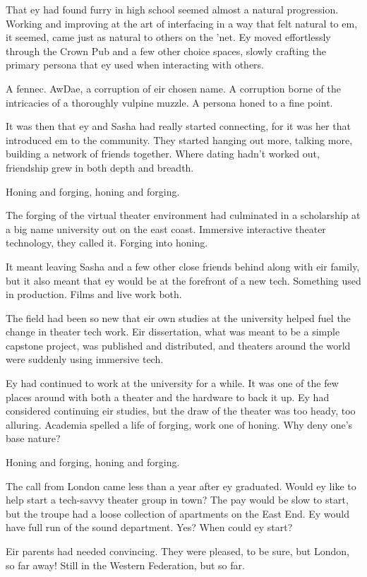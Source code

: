 That ey had found furry in high school seemed almost a natural progression. Working and improving at the art of interfacing in a way that felt natural to em, it seemed, came just as natural to others on the 'net. Ey moved effortlessly through the Crown Pub and a few other choice spaces, slowly crafting the primary persona that ey used when interacting with others.

A fennec. AwDae, a corruption of eir chosen name. A corruption borne of the intricacies of a thoroughly vulpine muzzle. A persona honed to a fine point.

It was then that ey and Sasha had really started connecting, for it was her that introduced em to the community. They started hanging out more, talking more, building a network of friends together. Where dating hadn't worked out, friendship grew in both depth and breadth.

Honing and forging, honing and forging.

The forging of the virtual theater environment had culminated in a scholarship at a big name university out on the east coast. Immersive interactive theater technology, they called it. Forging into honing.

It meant leaving Sasha and a few other close friends behind along with eir family, but it also meant that ey would be at the forefront of a new tech. Something used in production. Films and live work both.

The field had been so new that eir own studies at the university helped fuel the change in theater tech work. Eir dissertation, what was meant to be a simple capstone project, was published and distributed, and theaters around the world were suddenly using immersive tech.

Ey had continued to work at the university for a while. It was one of the few places around with both a theater and the hardware to back it up. Ey had considered continuing eir studies, but the draw of the theater was too heady, too alluring. Academia spelled a life of forging, work one of honing. Why deny one's base nature?

Honing and forging, honing and forging.

The call from London came less than a year after ey graduated. Would ey like to help start a tech-savvy theater group in town? The pay would be slow to start, but the troupe had a loose collection of apartments on the East End. Ey would have full run of the sound department. Yes? When could ey start?

Eir parents had needed convincing. They were pleased, to be sure, but London, so far away! Still in the Western Federation, but so far.

